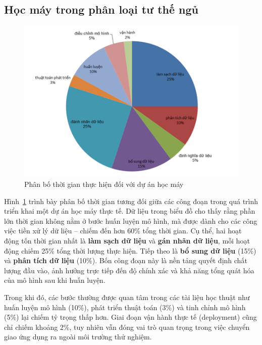 \subsection{Học máy trong phân loại tư thế ngủ}

 

\begin{figure}[htbp]
\centering
\includegraphics[width=1\textwidth]{images/hocmay_time.png}
\caption{Phân bố thời gian thực hiện đối với dự án học máy}
\label{hocmay_time}
\end{figure}

Hình~\ref{hocmay_time} trình bày phân bố thời gian tương đối giữa các 
công đoạn trong quá trình triển khai một dự án học máy thực tế. 
Dữ liệu trong biểu đồ cho thấy rằng phần lớn thời gian không nằm ở 
bước huấn luyện mô hình, mà được dành cho các công việc tiền xử lý 
dữ liệu – chiếm đến hơn 60\% tổng thời gian.
Cụ thể, hai hoạt động tốn thời gian nhất là \textbf{làm sạch dữ liệu} 
và \textbf{gán nhãn dữ liệu}, mỗi hoạt động chiếm 25\% tổng thời lượng 
thực hiện. Tiếp theo là \textbf{bổ sung dữ liệu} (15\%) và 
\textbf{phân tích dữ liệu} (10\%). Bốn công đoạn này là nền tảng quyết 
định chất lượng đầu vào, ảnh hưởng trực tiếp đến độ chính xác và khả 
năng tổng quát hóa của mô hình sau khi huấn luyện.

Trong khi đó, các bước thường được quan tâm trong các tài liệu học thuật 
như huấn luyện mô hình (10\%), phát triển thuật toán (3\%) và 
tinh chỉnh mô hình (5\%) lại chiếm tỷ trọng thấp hơn. 
Giai đoạn vận hành thực tế (deployment) cũng chỉ chiếm khoảng 2\%, 
tuy nhiên vẫn đóng vai trò quan trọng trong việc chuyển giao ứng dụng 
ra ngoài môi trường thử nghiệm.

